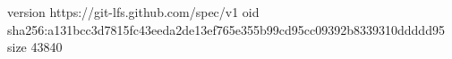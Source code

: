 version https://git-lfs.github.com/spec/v1
oid sha256:a131bcc3d7815fc43eeda2de13ef765e355b99cd95cc09392b8339310ddddd95
size 43840

